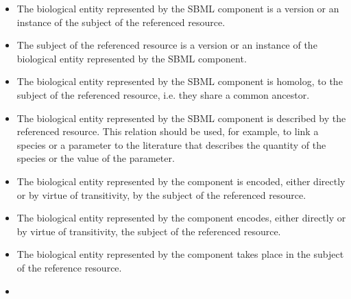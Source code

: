 \begin{itemize}
\item {} The biological entity represented
  by the SBML component is a version or an instance of the subject
  of the referenced resource.

\item {} The subject of the referenced
  resource is a version or an instance of the biological entity
  represented by the SBML component.

\item {} The biological entity represented
  by the SBML component is homolog, to the subject of the
  referenced resource, i.e. they share a common ancestor.

\item {} The biological entity
  represented by the SBML component is described by the referenced
  resource. This relation should be used, for example, to link a
  species or a parameter to the literature that describes the
  quantity of the species or the value of the parameter.

\item {} The biological entity represented
  by the  component is encoded, either directly or by virtue
  of transitivity, by the subject of the referenced resource.

\item {} The biological entity represented by
  the  component encodes, either directly or by virtue of
  transitivity, the subject of the referenced resource.

\item {}  The biological entity represented by the  component takes place in the subject of the reference resource.

\item {}

\end{itemize}



